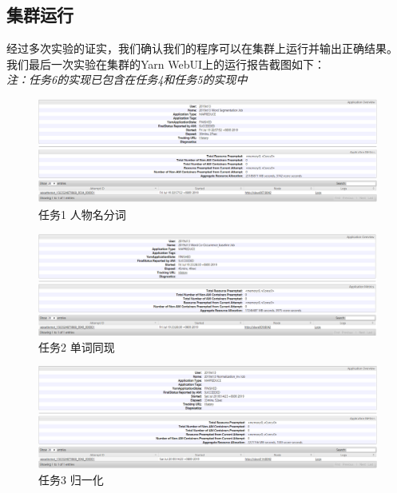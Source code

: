 \subsection{集群运行}
经过多次实验的证实，我们确认我们的程序可以在集群上运行并输出正确结果。
我们最后一次实验在集群的Yarn WebUI上的运行报告截图如下：
\\
\emph{注：任务6的实现已包含在任务4和任务5的实现中}
\begin{figure}[htb]
	\centering
	\includegraphics[scale=0.35]{figures/task1.PNG}
	\caption{任务1 人物名分词}
\end{figure}
\begin{figure}[htb]
	\centering
	\includegraphics[scale=0.35]{figures/task2.PNG}
	\caption{任务2 单词同现}
\end{figure}
\begin{figure}[htb]
	\centering
	\includegraphics[scale=0.35]{figures/task3.PNG}
	\caption{任务3 归一化}
\end{figure}
